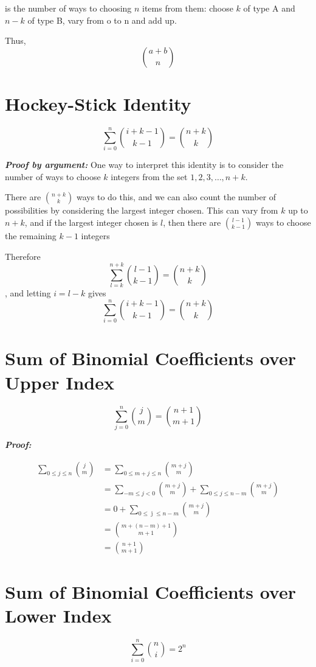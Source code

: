 \documentclass{article}
\begin{document}
is the number of ways to choosing $n$ items from them: choose $k$ of type A and $n - k$ of type B, vary from o to n and add up.

Thus,
\[
    {a + b \choose n}
\]

\section{Hockey-Stick Identity}

\[
    \sum_{i=0}^n\binom{i+k-1}{k-1}=\binom{n+k}{k}
\]

\textbf{\textit{Proof by argument:}}
One way to interpret this identity is to consider the number of ways to choose $k$ integers from the set ${1, 2, 3, \ldots, n + k}$.

There are $\binom{n+k}{k}$ ways to do this, and we can also count the number of possibilities by considering the largest integer chosen. This can vary from $k$ up to $n+k$, and if the largest integer chosen is $l$, then there are $\binom{l-1}{k-1}$ ways to choose the remaining $k-1$ integers

Therefore
\[
    \displaystyle\sum_{l=k}^{n+k}\binom{l-1}{k-1}=\binom{n+k}{k}
\]
, and letting $i = l - k$ gives
\[
    \displaystyle\sum_{i=0}^{n}\binom{i+k-1}{k-1}=\binom{n+k}{k}
\]


\section{Sum of Binomial Coefficients over Upper Index}
\[
    \displaystyle \sum_{j \mathop = 0}^n \binom j m = \binom {n + 1} {m + 1}
\]

\textbf{\textit{Proof:}}

\begin{align*}
    \displaystyle \sum_{0 \mathop \le j \mathop \le n} \binom j m &= \displaystyle \sum_{0 \mathop \le m + j \mathop \le n} \binom {m + j} m \\
    &= \displaystyle \sum_{-m \mathop \le j \mathop < 0} \binom {m + j} m + \sum_{0 \mathop \le j \mathop \le n - m} \binom {m + j} m \\
    &= \displaystyle 0 + \sum_{0 \mathop \le \mathop j \mathop \le n - m} \binom {m + j} m \\
    &=\displaystyle \binom {m + \left({n - m}\right) + 1} {m + 1} \\
    &=\displaystyle \binom {n + 1} {m + 1}
%
\end{align*}


\section{Sum of Binomial Coefficients over Lower Index}
\[
    \displaystyle \sum_{i \mathop = 0}^n \binom n i = 2^n
\]
\end{document}
